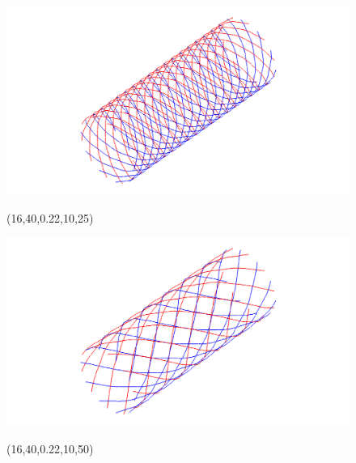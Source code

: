 \begin{figure} [ht]
\begin{latexonly}
\begin{minipage} [c] [] [c] {5.5cm}
\end{minipage}
\hspace{0.3cm}
\hspace{0.1cm}
	\begin{minipage} [c] [] [c]{5.5cm} 
	\includegraphics [width =\textwidth] {images/WireStentD16L40d22n10b25}
	\begin{center}
	\vspace{-3ex}
	(16,40,0.22,10,25)
	\vspace{1ex}
	\end{center}
\end{minipage}
\hspace{0.3cm}
\begin{minipage} [c] [] [c] {5.5cm}
	\includegraphics [width =\textwidth] {images/WireStentD16L40d22n10b50}
	\begin{center}
	\vspace{-3ex}
	(16,40,0.22,10,50)
	\vspace{1ex}
	\end{center}
\end{minipage}
\hspace{0.3cm}
\hspace{0.1cm}

\end{latexonly}
\end{figure}
